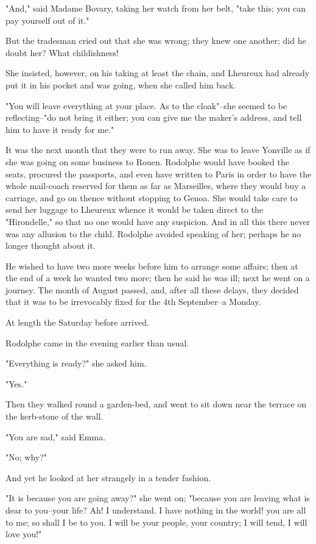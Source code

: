\documentclass[11pt,twocolumn]{ltugboat}
\begin{document}
"And," said Madame Bovary, taking her watch from her belt, "take this;
you can pay yourself out of it."

But the tradesman cried out that she was wrong; they knew one another;
did he doubt her? What childishness!

She insisted, however, on his taking at least the chain, and Lheureux
had already put it in his pocket and was going, when she called him
back.

"You will leave everything at your place. As to the cloak"--she seemed
to be reflecting--"do not bring it either; you can give me the maker's
address, and tell him to have it ready for me."

It was the next month that they were to run away. She was to leave
Yonville as if she was going on some business to Rouen. Rodolphe would
have booked the seats, procured the passports, and even have written to
Paris in order to have the whole mail-coach reserved for them as far as
Marseilles, where they would buy a carriage, and go on thence without
stopping to Genoa. She would take care to send her luggage to Lheureux
whence it would be taken direct to the "Hirondelle," so that no one
would have any suspicion. And in all this there never was any allusion
to the child. Rodolphe avoided speaking of her; perhaps he no longer
thought about it.

He wished to have two more weeks before him to arrange some affairs;
then at the end of a week he wanted two more; then he said he was ill;
next he went on a journey. The month of August passed, and, after all
these delays, they decided that it was to be irrevocably fixed for the
4th September--a Monday.

At length the Saturday before arrived.

Rodolphe came in the evening earlier than usual.

"Everything is ready?" she asked him.

"Yes."

Then they walked round a garden-bed, and went to sit down near the
terrace on the kerb-stone of the wall.

"You are sad," said Emma.

"No; why?"

And yet he looked at her strangely in a tender fashion.

"It is because you are going away?" she went on; "because you are
leaving what is dear to you--your life? Ah! I understand. I have nothing
in the world! you are all to me; so shall I be to you. I will be your
people, your country; I will tend, I will love you!"
\end{document}

